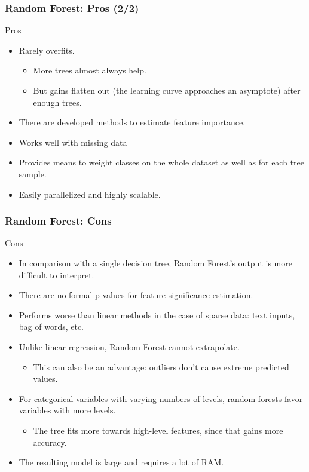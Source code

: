 \begin{frame}[fragile]\frametitle{Random Forest: Pros (2/2)}
Pros
\begin{itemize}
\item Rarely overfits.
\begin{itemize}
\item More trees almost always help.
\item But gains flatten out (the learning curve approaches an asymptote) after enough trees.
\end{itemize}
\item There are developed methods to estimate feature importance.
\item Works well with missing data
\item Provides means to weight classes on the whole dataset as well as for each tree sample.
\item Easily parallelized and highly scalable.
\end{itemize}
\end{frame}


\begin{frame}[fragile]\frametitle{Random Forest: Cons}
Cons
\begin{itemize}
\item In comparison with a single decision tree, Random Forest's output is more difficult to interpret.
\item There are no formal p-values for feature significance estimation.
\item Performs worse than linear methods in the case of sparse data: text inputs, bag of words, etc.
\item Unlike linear regression, Random Forest cannot extrapolate.
\begin{itemize}
\item This can also be an advantage: outliers don't cause extreme predicted values.
\end{itemize}
\item For categorical variables with varying numbers of levels, random forests favor variables with more levels.
\begin{itemize}
\item The tree fits more towards high-level features, since that gains more accuracy.
\end{itemize}
\item The resulting model is large and requires a lot of RAM.
\end{itemize}
\end{frame}



